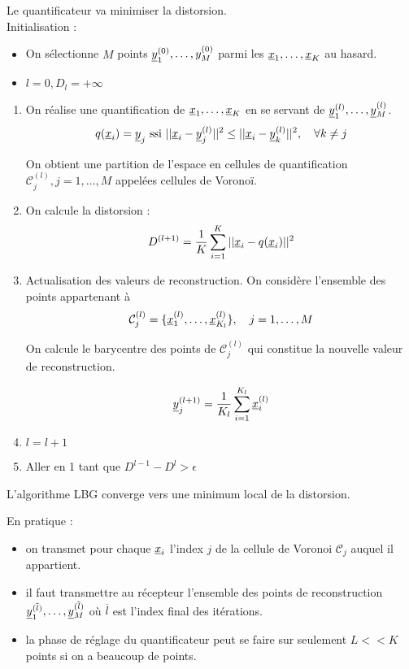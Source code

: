 \documentclass[main.tex]{subfiles}
\begin{document}
Le quantificateur va minimiser la distorsion.\\

Initialisation :
\begin{itemize}
\item On sélectionne $M$ points $\underline{y}_1^{(0)},\dots,y_M^{(0)}$ parmi les $\underline{x}_1,\dots,\underline{x}_K$ au hasard.
\item $l=0, D_l = + \infty$
\end{itemize}

\begin{enumerate}
\item On réalise une quantification de $\underline{x}_1,\dots,\underline{x}_K$ en se servant de $\underline{y}_1^{(l)},\dots,\underline{y}_M^{(l)}$.
\[ q(\underline{x}_i) = \underline{y}_j \text{ ssi } ||\underline{x}_i-\underline{y}_j^{(l)}||^2 \leq ||\underline{x}_i-\underline{y}_k^{(l)}||^2, \quad \forall k\neq j\]

\newcommand{\Cc}{\mathcal{C}}

On obtient une partition de l'espace en cellules de quantification $\Cc_j^{(l)},j=1,\dots,M$ appelées cellules de Voronoï.


\item On calcule la distorsion :
\[ D^{(l+1)} = \frac{1}{K} \sum_{i=1}^K ||\underline{x}_i-q(\underline{x}_i)||^2 \]

\item Actualisation des valeurs de reconstruction. On considère l'ensemble des points appartenant à \[\Cc_j^{(l)} = \{ \x_1^{(l)},\dots, \x_{K_l}^{(l)} \}, \quad j = 1,\dots,M\]

On calcule le barycentre des points de $\Cc_j^{(l)}$ qui constitue la nouvelle valeur de reconstruction.

\[\underline{y}_j^{(l+1)} = \frac{1}{K_l} \sum_{i=1}^{K_l} \underline{x}_i^{(l)} \]

\item $l=l+1$

\item Aller en 1 tant que $D^{l-1} - D^l > \epsilon$

\end{enumerate}

L'algorithme LBG converge vers une minimum local de la distorsion.

\newcommand{\Cc}{\mathcal{C}}
En pratique :
\begin{itemize}
\item on transmet pour chaque $\underline{x}_i$ l'index $j$ de la cellule de Voronoi  $\Cc_j$ auquel il appartient.
\item il faut transmettre au récepteur l'ensemble des points de reconstruction $\underline{y}_1^{(\overline{l})},\dots,\underline{y}_M^{(\overline{l})}$ où $\overline{l}$ est l'index final des itérations.
\item la phase de réglage du quantificateur peut se faire sur seulement $L<<K$ points si on a beaucoup de points.
\end{itemize}
\end{document}
